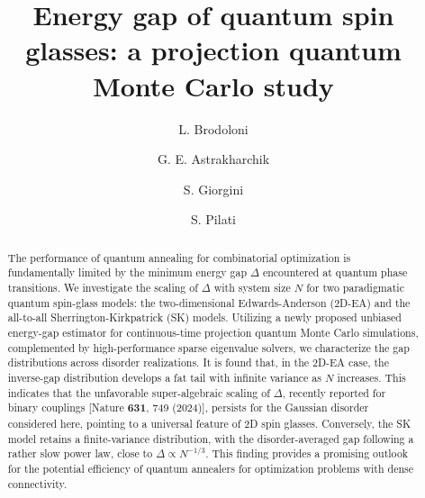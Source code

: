 \documentclass[aps,prl,twocolumn,superscriptaddress,nofootinbib]{revtex4-2}
\begin{document}
\title{Energy gap of quantum spin glasses: a projection quantum Monte Carlo study}

\author{L. Brodoloni }

\author{G. E. Astrakharchik }

\author{S. Giorgini }

\author{S. Pilati }



\begin{abstract}
The performance of quantum annealing for combinatorial optimization is fundamentally limited by the minimum energy gap $\Delta$ encountered at quantum phase transitions. We investigate the scaling of $\Delta$ with system size $N$ for two paradigmatic quantum spin-glass models: the two-dimensional Edwards-Anderson (2D-EA) and the all-to-all Sherrington-Kirkpatrick (SK) models. Utilizing a newly proposed unbiased energy-gap estimator for continuous-time projection quantum Monte Carlo simulations, complemented by high-performance sparse eigenvalue solvers, we characterize the gap distributions across disorder realizations. It is found that, in the 2D-EA case, the inverse-gap distribution develops a fat tail with infinite variance as $N$ increases. This indicates that the unfavorable super-algebraic scaling of $\Delta$, recently reported for binary couplings [Nature {\bf 631}, 749 (2024)], persists for the Gaussian disorder considered here, pointing to a universal feature of 2D spin glasses. Conversely, the SK model retains a finite-variance distribution, with the disorder-averaged gap following a rather slow power law, close to $\Delta \propto N^{-1/3}$.
This finding provides a promising outlook for the potential efficiency of quantum annealers for optimization problems with dense connectivity.
\end{abstract}
\end{document}

